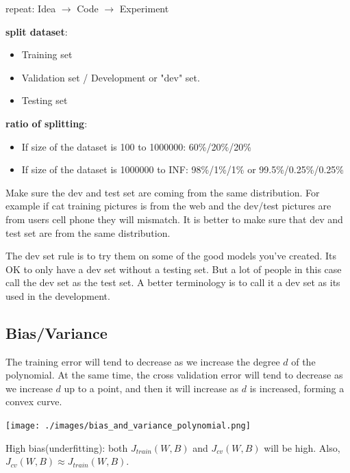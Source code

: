 \documentclass{article}
\begin{document}
\noindent repeat: Idea \(\longrightarrow\) Code \(\longrightarrow\) Experiment

\bigskip

\noindent \textbf{split dataset}:

\begin{itemize}
  \item Training set
  \item Validation set / Development or "dev" set.
  \item Testing set
\end{itemize}

\noindent \textbf{ratio of splitting}:
\begin{itemize}
  \item If size of the dataset is 100 to 1000000: 60\%/20\%/20\%
  \item If size of the dataset is 1000000 to INF: 98\%/1\%/1\% or 99.5\%/0.25\%/0.25\%
\end{itemize}

\noindent Make sure the dev and test set are coming from the same distribution. For example if cat training pictures is from the web and the dev/test pictures are from users cell phone they will mismatch. It is better to make sure that dev and test set are from the same distribution.

\bigskip

\noindent The dev set rule is to try them on some of the good models you've created. Its OK to only have a dev set without a testing set. But a lot of people in this case call the dev set as the test set. A better terminology is to call it a dev set as its used in the development.

\subsection{Bias/Variance}

\noindent The training error will tend to decrease as we increase the degree \(d\) of the polynomial. At the same time, the cross validation error will tend to decrease as we increase \(d\) up to a point, and then it will increase as \(d\) is increased, forming a convex curve.

\begin{center}
\texttt{[image: ./images/bias\_and\_variance\_polynomial.png]}
\end{center}

\noindent High bias(underfitting): both \(J_{train}(W, B)\) and \(J_{cv}(W, B)\) will be high. Also, \(J_{cv}(W, B) \approx J_{train}(W, B)\). 
\end{document}
